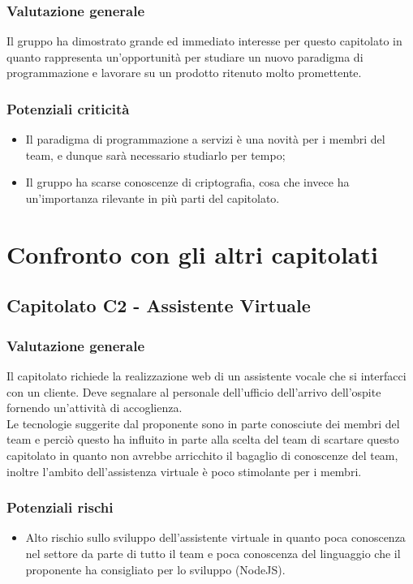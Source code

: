 \documentclass[12pt,a4paper,titlepage]{article}
\begin{document}
\subsubsection{Valutazione generale }
Il gruppo ha dimostrato grande ed immediato interesse per questo capitolato in quanto rappresenta un'opportunità per studiare un nuovo paradigma di programmazione e lavorare su un prodotto ritenuto molto promettente. 
\subsubsection{Potenziali criticità}
\begin{itemize}
	\item Il paradigma di programmazione a servizi è una novità per i membri del team, e dunque sarà necessario studiarlo per tempo;
	\item Il gruppo ha scarse conoscenze di criptografia, cosa che invece ha un'importanza rilevante in più parti del capitolato.
\end{itemize}

\newpage

\section{Confronto con gli altri capitolati}

\subsection{Capitolato C2 - Assistente Virtuale}
\subsubsection{Valutazione generale}
Il capitolato richiede la realizzazione web di un assistente vocale che si interfacci con un cliente. Deve segnalare al personale dell'ufficio dell'arrivo dell'ospite fornendo un'attività di accoglienza.\\
Le tecnologie suggerite dal proponente sono in parte conosciute dei membri del team e perciò questo ha influito in parte alla scelta del team di scartare questo capitolato in quanto non avrebbe arricchito il bagaglio di conoscenze del team, inoltre l'ambito dell'assistenza virtuale è poco stimolante per i membri.
\subsubsection{Potenziali rischi}
\begin{itemize}
	\item Alto rischio sullo sviluppo dell'assistente virtuale in quanto poca conoscenza nel settore da parte di tutto il team e poca conoscenza del linguaggio che il proponente ha consigliato per lo sviluppo (NodeJS).
\end{itemize}
\end{document}
